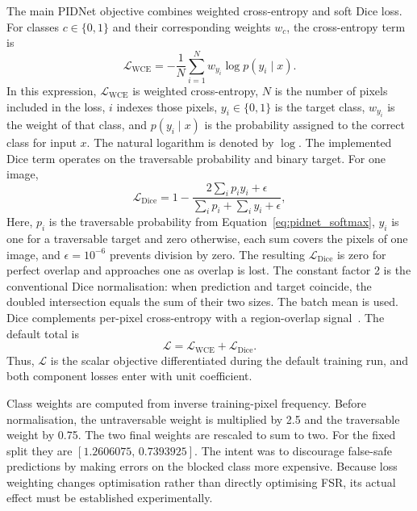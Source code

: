 The main PIDNet objective combines weighted cross-entropy and soft Dice loss.
For classes $c\in\{0,1\}$ and their corresponding weights $w_c$, the
cross-entropy term is
\begin{equation}
 \mathcal{L}_{\mathrm{WCE}}
 =-\frac{1}{N}\sum_{i=1}^{N}w_{y_i}\log p(y_i\mid x).
\end{equation}
In this expression, $\mathcal{L}_{\mathrm{WCE}}$ is weighted cross-entropy,
$N$ is the number of pixels included in the loss, $i$ indexes those pixels,
$y_i\in\{0,1\}$ is the target class, $w_{y_i}$ is the weight of that class,
and $p(y_i\mid x)$ is the probability assigned to the correct class for input
$x$. The natural logarithm is denoted by $\log$.
The implemented Dice term operates on the traversable probability and binary
target. For one image,
\begin{equation}
 \mathcal{L}_{\mathrm{Dice}}
 =1-\frac{2\sum_i p_i y_i+\epsilon}
 {\sum_i p_i+\sum_i y_i+\epsilon},
 \label{eq:pidnet_dice}
\end{equation}
Here, $p_i$ is the traversable probability from
Equation~\ref{eq:pidnet_softmax}, $y_i$ is one for a traversable target and
zero otherwise, each sum covers the pixels of one image, and
$\epsilon=10^{-6}$ prevents division by zero. The resulting
$\mathcal{L}_{\mathrm{Dice}}$ is zero for perfect overlap and approaches one
as overlap is lost. The constant factor 2 is the conventional Dice
normalisation: when prediction and target coincide, the doubled intersection
equals the sum of their two sizes. The batch mean is used. Dice complements per-pixel
cross-entropy with a
region-overlap signal~\cite{milletari2016vnet}. The default total is
\begin{equation}
 \mathcal{L}=\mathcal{L}_{\mathrm{WCE}}+\mathcal{L}_{\mathrm{Dice}}.
\end{equation}
Thus, $\mathcal{L}$ is the scalar objective differentiated during the default
training run, and both component losses enter with unit coefficient.

Class weights are computed from inverse training-pixel frequency. Before
normalisation, the untraversable weight is multiplied by 2.5 and the
traversable weight by 0.75. The two final weights are rescaled to sum to two.
For the fixed split they are $[1.2606075,\,0.7393925]$. The intent was to
discourage false-safe predictions by making errors on the blocked class more
expensive. Because loss weighting changes optimisation rather than directly
optimising FSR, its actual effect must be established experimentally.

